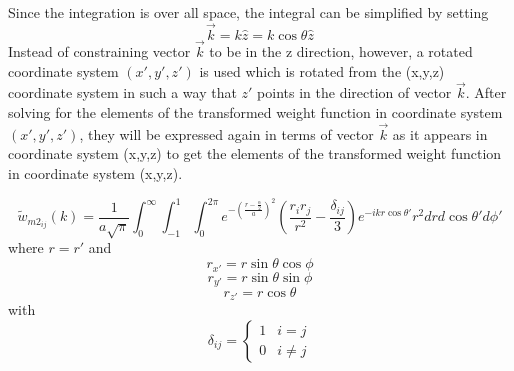 \documentclass[letterpaper,twocolumn,amsmath,amssymb,prb]{revtex4-1}
\begin{document}
\begin{widetext}
Since the integration is over all space, the integral can be simplified by setting 
\begin{equation}{\vec{k}=k\hat{z}=k\cos\theta\hat{z}}\end{equation}
Instead of constraining vector $\vec{k}$ to be in the z direction, however, a rotated coordinate system $(x',y',z')$ is used which is rotated from the (x,y,z) coordinate system in such a way that $z'$ points in the direction of vector $\vec{k}$. After solving for the elements of the transformed weight function in coordinate system $(x',y',z')$, they will be expressed again in terms of vector $\vec{k}$ as it appears in coordinate system (x,y,z) to get the elements of the transformed weight function in coordinate system (x,y,z).

\begin{equation}{\widetilde{w}_{m2_{ij}}(k)=\frac{1}{a\sqrt{\pi}}\int_{0}^{\infty}\int_{-1}^{1}\int_{0}^{2\pi}e^{-\left(\frac{r-\frac{\alpha}{2}}{a}\right)^2}\left(\frac{r_ir_j}{r^2}-\frac{\delta_{ij}}{3}\right)e^{-ikr\cos\theta'}r^2d{r}d{\cos\theta'}d{\phi'}}\end{equation}
where $r=r'$ and
\begin{displaymath}{r_{x'}=r\sin\theta\cos\phi}\end{displaymath}
\begin{displaymath}{r_{y'}=r\sin\theta\sin\phi}\end{displaymath}
\begin{displaymath}{r_{z'}=r\cos\theta}\end{displaymath} 
with
\begin{displaymath}{\delta_{ij}=\left\{ \begin{array}{rc} 1 & i = j \\ 0  & i\neq j \end{array}\right.}\end{displaymath}
\[{}\]


\end{widetext}
\end{document}
